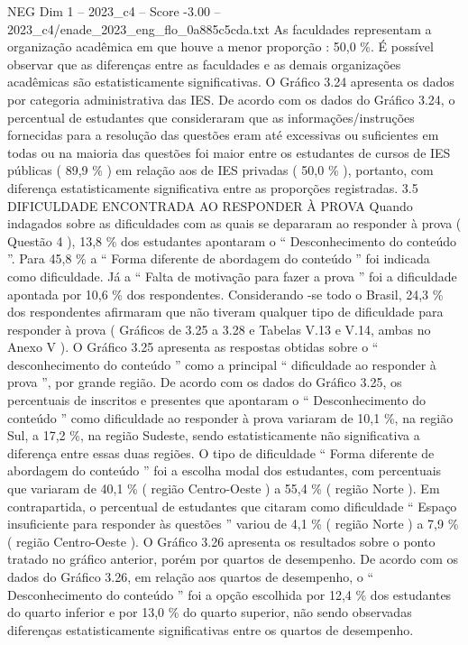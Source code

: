\begin{textsample}{NEG Dim 1 – 2023\_c4 – Score -3.00 – 2023\_c4/enade\_2023\_eng\_flo\_0a885c5cda.txt}
As faculdades representam a organização acadêmica em que houve a menor proporção : 50,0 \%.
É possível observar que as diferenças entre as faculdades e as demais organizações acadêmicas são estatisticamente significativas.
O Gráfico 3.24 apresenta os dados por categoria administrativa das IES.
De acordo com os dados do Gráfico 3.24, o percentual de estudantes que consideraram que as informações/instruções fornecidas para a resolução das questões eram até excessivas ou suficientes em todas ou na maioria das questões foi maior entre os estudantes de cursos de IES públicas ( 89,9 \% ) em relação aos de IES privadas ( 50,0 \% ), portanto, com diferença estatisticamente significativa entre as proporções registradas. 3.5 DIFICULDADE ENCONTRADA AO RESPONDER À PROVA Quando indagados sobre as dificuldades com as quais se depararam ao responder à prova ( Questão 4 ), 13,8 \% dos estudantes apontaram o “ Desconhecimento do conteúdo ”.
Para 45,8 \% a “ Forma diferente de abordagem do conteúdo ” foi indicada como dificuldade.
Já a “ Falta de motivação para fazer a prova ” foi a dificuldade apontada por 10,6 \% dos respondentes.
Considerando -se todo o Brasil, 24,3 \% dos respondentes afirmaram que não tiveram qualquer tipo de dificuldade para responder à prova ( Gráficos de 3.25 a 3.28 e Tabelas V.13 e V.14, ambas no Anexo V ).
O Gráfico 3.25 apresenta as respostas obtidas sobre o “ desconhecimento do conteúdo ” como a principal “ dificuldade ao responder à prova ”, por grande região.
De acordo com os dados do Gráfico 3.25, os percentuais de inscritos e presentes que apontaram o “ Desconhecimento do conteúdo ” como dificuldade ao responder à prova variaram de 10,1 \%, na região Sul, a 17,2 \%, na região Sudeste, sendo estatisticamente não significativa a diferença entre essas duas regiões.
O tipo de dificuldade “ Forma diferente de abordagem do conteúdo ” foi a escolha modal dos estudantes, com percentuais que variaram de 40,1 \% ( região Centro-Oeste ) a 55,4 \% ( região Norte ).
Em contrapartida, o percentual de estudantes que citaram como dificuldade “ Espaço insuficiente para responder às questões ” variou de 4,1 \% ( região Norte ) a 7,9 \% ( região Centro-Oeste ).
O Gráfico 3.26 apresenta os resultados sobre o ponto tratado no gráfico anterior, porém por quartos de desempenho.
De acordo com os dados do Gráfico 3.26, em relação aos quartos de desempenho, o “ Desconhecimento do conteúdo ” foi a opção escolhida por 12,4 \% dos estudantes do quarto inferior e por 13,0 \% do quarto superior, não sendo observadas diferenças estatisticamente significativas entre os quartos de desempenho.

\end{textsample}

